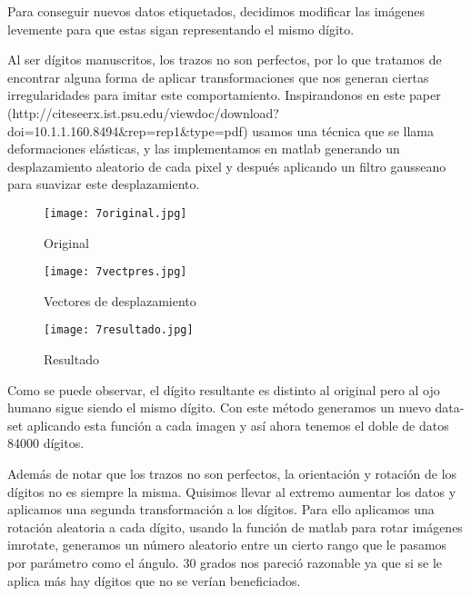 Para conseguir nuevos datos etiquetados, decidimos modificar las imágenes levemente para que estas sigan representando el mismo dígito.

Al ser dígitos manuscritos, los trazos no son perfectos, por lo que tratamos de encontrar alguna forma de aplicar transformaciones que nos generan ciertas irregularidades para imitar este comportamiento. Inspirandonos en este paper (http://citeseerx.ist.psu.edu/viewdoc/download?doi=10.1.1.160.8494\&rep=rep1\&type=pdf)
usamos una técnica que se llama deformaciones elásticas, y las implementamos en matlab generando un desplazamiento aleatorio de cada pixel y después aplicando un filtro gausseano para suavizar este desplazamiento. \\

\begin{algorithm}[H]
\NoCaptionOfAlgo
\end{algorithm}

\begin{figure}[!htb]
  \texttt{[image: 7original.jpg]}
  \caption{Original}
\endminipage\hfill
{}
  \texttt{[image: 7vectpres.jpg]}
  \caption{Vectores de desplazamiento}
\endminipage\hfill
{}%
  \texttt{[image: 7resultado.jpg]}
  \caption{Resultado}
\endminipage
\end{figure}


Como se puede observar, el dígito resultante es distinto al original pero al ojo humano sigue siendo el mismo dígito. Con este método generamos un nuevo data-set aplicando esta función a cada imagen y así ahora tenemos el doble de datos 84000 dígitos. 

Además de notar que los trazos no son perfectos, la orientación y rotación de los dígitos no es siempre la misma. Quisimos llevar al extremo aumentar los datos y aplicamos una segunda transformación a los dígitos. Para ello aplicamos una rotación aleatoria a cada dígito, usando la función de matlab para rotar imágenes imrotate, generamos un número aleatorio entre un cierto rango que le pasamos por parámetro como el ángulo. 30 grados nos pareció razonable ya que si se le aplica más hay dígitos que no se verían beneficiados.


